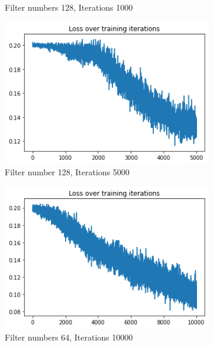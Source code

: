\documentclass [a4paper, 11pt] {article}
\begin{document}
\begin{enumerate}
\begin{figure}[!h]
\begin{subfigure}{0.4\textwidth}
		\caption{Filter numbers 128, Iterations 1000}
		\label{fig:128-1000}
	\end{subfigure}
	\begin{subfigure}{0.4\textwidth}
		\centering
		\includegraphics[width=\textwidth]{img/128-5000.png}
		\caption{Filter number 128, Iterations 5000}
		\label{fig:128-5000}
	\end{subfigure}
	\begin{subfigure}{0.4\textwidth}
		\centering
		\includegraphics[width=\textwidth]{img/64-10000.png}
		\caption{Filter numbers 64, Iterations 10000}
		\label{fig:64-10000}
	\end{subfigure}
	\begin{subfigure}{0.4\textwidth}
		\centering

\end{subfigure}
\end{figure}
\end{enumerate}
\end{document}
